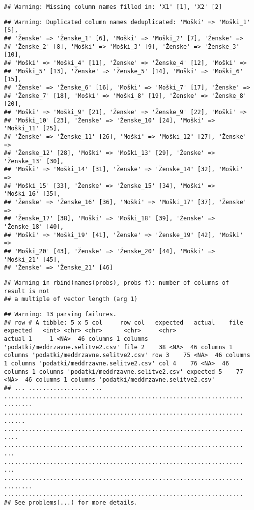 \documentclass[]{article}
\begin{document}
\begin{verbatim}
## Warning: Missing column names filled in: 'X1' [1], 'X2' [2]
\end{verbatim}

\begin{verbatim}
## Warning: Duplicated column names deduplicated: 'Moški' => 'Moški_1' [5],
## 'Ženske' => 'Ženske_1' [6], 'Moški' => 'Moški_2' [7], 'Ženske' =>
## 'Ženske_2' [8], 'Moški' => 'Moški_3' [9], 'Ženske' => 'Ženske_3' [10],
## 'Moški' => 'Moški_4' [11], 'Ženske' => 'Ženske_4' [12], 'Moški' =>
## 'Moški_5' [13], 'Ženske' => 'Ženske_5' [14], 'Moški' => 'Moški_6' [15],
## 'Ženske' => 'Ženske_6' [16], 'Moški' => 'Moški_7' [17], 'Ženske' =>
## 'Ženske_7' [18], 'Moški' => 'Moški_8' [19], 'Ženske' => 'Ženske_8' [20],
## 'Moški' => 'Moški_9' [21], 'Ženske' => 'Ženske_9' [22], 'Moški' =>
## 'Moški_10' [23], 'Ženske' => 'Ženske_10' [24], 'Moški' => 'Moški_11' [25],
## 'Ženske' => 'Ženske_11' [26], 'Moški' => 'Moški_12' [27], 'Ženske' =>
## 'Ženske_12' [28], 'Moški' => 'Moški_13' [29], 'Ženske' => 'Ženske_13' [30],
## 'Moški' => 'Moški_14' [31], 'Ženske' => 'Ženske_14' [32], 'Moški' =>
## 'Moški_15' [33], 'Ženske' => 'Ženske_15' [34], 'Moški' => 'Moški_16' [35],
## 'Ženske' => 'Ženske_16' [36], 'Moški' => 'Moški_17' [37], 'Ženske' =>
## 'Ženske_17' [38], 'Moški' => 'Moški_18' [39], 'Ženske' => 'Ženske_18' [40],
## 'Moški' => 'Moški_19' [41], 'Ženske' => 'Ženske_19' [42], 'Moški' =>
## 'Moški_20' [43], 'Ženske' => 'Ženske_20' [44], 'Moški' => 'Moški_21' [45],
## 'Ženske' => 'Ženske_21' [46]
\end{verbatim}

\begin{verbatim}
## Warning in rbind(names(probs), probs_f): number of columns of result is not
## a multiple of vector length (arg 1)
\end{verbatim}

\begin{verbatim}
## Warning: 13 parsing failures.
## row # A tibble: 5 x 5 col     row col   expected   actual    file                              expected   <int> <chr> <chr>      <chr>     <chr>                             actual 1     1 <NA>  46 columns 1 columns 'podatki/meddrzavne.selitve2.csv' file 2    38 <NA>  46 columns 1 columns 'podatki/meddrzavne.selitve2.csv' row 3    75 <NA>  46 columns 1 columns 'podatki/meddrzavne.selitve2.csv' col 4    76 <NA>  46 columns 1 columns 'podatki/meddrzavne.selitve2.csv' expected 5    77 <NA>  46 columns 1 columns 'podatki/meddrzavne.selitve2.csv'
## ... ................. ... .................................................................... ........ .................................................................... ...... .................................................................... .... .................................................................... ... .................................................................... ... .................................................................... ........ ....................................................................
## See problems(...) for more details.
\end{verbatim}
\end{document}
